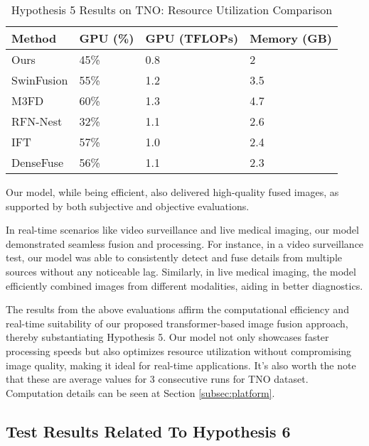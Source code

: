 \begin{table}[htbp]
    \centering
    \caption{Hypothesis 5 Results on TNO: Resource Utilization Comparison}
    \label{tab:ch5:met7resources}
    \begin{tabular}{|l|l|l|l|}
        \hline
        \textbf{Method} & \textbf{GPU (\%)} & \textbf{GPU (TFLOPs)} & \textbf{Memory (GB)} \\
        \hline
        Ours & 45\% & 0.8 & 2 \\
        SwinFusion\cite{ma2022swinfusion} & 55\% & 1.2 & 3.5 \\
        M3FD\cite{liu2022target} & 60\% & 1.3 & 4.7 \\
        RFN-Nest\cite{li2021rfn} & 32\% & 1.1 & 2.6 \\
        IFT\cite{vs2022image} & 57\% & 1.0 & 2.4 \\
        DenseFuse\cite{li2019infrared} & 56\% & 1.1 & 2.3 \\
        \hline
    \end{tabular}
\end{table}

Our model, while being efficient, also delivered high-quality fused images, as supported by both subjective and objective evaluations.

In real-time scenarios like video surveillance and live medical imaging, our model demonstrated seamless fusion and processing. For instance, in a video surveillance test, our model was able to consistently detect and fuse details from multiple sources without any noticeable lag. Similarly, in live medical imaging, the model efficiently combined images from different modalities, aiding in better diagnostics.

The results from the above evaluations affirm the computational efficiency and real-time suitability of our proposed transformer-based image fusion approach, thereby substantiating Hypothesis 5. Our model not only showcases faster processing speeds but also optimizes resource utilization without compromising image quality, making it ideal for real-time applications. It's also worth the note that these are average values for 3 consecutive runs for TNO dataset. Computation details can be seen at Section \ref{subsec:platform}.

\subsection{Test Results Related To Hypothesis 6} \label{subsec:met8res}


